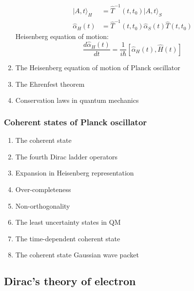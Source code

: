 \documentclass[12pt]{article}
\numberwithin{equation}{section}
\begin{document}
\begin{enumerate}
\begin{equation}
\begin{split}
	|A,t\rangle_H&=\hat{T}^{-1}(t,t_0)|A,t\rangle_S\\
	\hat{\alpha}_H(t)&=\hat{T}^{-1}(t,t_0)\hat{\alpha}_S(t)\hat{T}(t,t_0)
	\end{split}\end{equation}
	Heisenberg equation of motion:
	\begin{equation}\frac{d\hat{\alpha}_H(t)}{dt}=\frac{1}{i\hbar}[\hat{\alpha}_H(t), \hat{H}(t)]\end{equation}
\item The Heisenberg equation of motion of Planck oscillator
\item The Ehrenfest theorem
\item Conservation laws in quantum mechanics
\end{enumerate}
\subsubsection{Coherent states of Planck oscillator}
\begin{enumerate}
\item The coherent state
\item The fourth Dirac ladder operators
\item Expansion in Heisenberg representation
\item Over-completeness
\item Non-orthogonality
\item The least uncertainty states in QM
\item The time-dependent coherent state
\item The coherent state Gaussian wave packet
\end{enumerate}
\subsection{Dirac's theory of electron}
\end{document}

